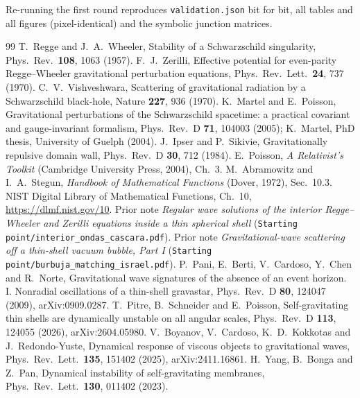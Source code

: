 \documentclass[11pt,a4paper]{article}
\numberwithin{equation}{section}
\begin{document}
\medskip\noindent Re-running the first round reproduces \texttt{validation.json} bit for bit, all tables and all
figures (pixel-identical) and the symbolic junction matrices.

\begin{thebibliography}{99}\small
{} T.~Regge and J.~A.~Wheeler, Stability of a Schwarzschild singularity, Phys.\ Rev.\ \textbf{108}, 1063 (1957).
 F.~J.~Zerilli, Effective potential for even-parity Regge--Wheeler gravitational perturbation equations, Phys.\ Rev.\ Lett.\ \textbf{24}, 737 (1970).
 C.~V.~Vishveshwara, Scattering of gravitational radiation by a Schwarzschild black-hole, Nature \textbf{227}, 936 (1970).
 K.~Martel and E.~Poisson, Gravitational perturbations of the Schwarzschild spacetime: a practical covariant and gauge-invariant formalism, Phys.\ Rev.\ D \textbf{71}, 104003 (2005); K.~Martel, PhD thesis, University of Guelph (2004).
 J.~Ipser and P.~Sikivie, Gravitationally repulsive domain wall, Phys.\ Rev.\ D \textbf{30}, 712 (1984).
 E.~Poisson, \emph{A Relativist's Toolkit} (Cambridge University Press, 2004), Ch.~3.
 M.~Abramowitz and I.~A.~Stegun, \emph{Handbook of Mathematical Functions} (Dover, 1972), Sec.~10.3.
 NIST Digital Library of Mathematical Functions, Ch.~10, \url{https://dlmf.nist.gov/10}.
 Prior note \emph{Regular wave solutions of the interior Regge--Wheeler and Zerilli equations inside a thin spherical shell} (\texttt{Starting point/interior\_ondas\_cascara.pdf}).
 Prior note \emph{Gravitational-wave scattering off a thin-shell vacuum bubble, Part I} (\texttt{Starting point/burbuja\_matching\_israel.pdf}).
 P.~Pani, E.~Berti, V.~Cardoso, Y.~Chen and R.~Norte, Gravitational wave signatures of the absence of an event horizon. I. Nonradial oscillations of a thin-shell gravastar, Phys.\ Rev.\ D \textbf{80}, 124047 (2009), arXiv:0909.0287.
 T.~Pitre, B.~Schneider and E.~Poisson, Self-gravitating thin shells are dynamically unstable on all angular scales, Phys.\ Rev.\ D \textbf{113}, 124055 (2026), arXiv:2604.05980.
 V.~Boyanov, V.~Cardoso, K.~D.~Kokkotas and J.~Redondo-Yuste, Dynamical response of viscous objects to gravitational waves, Phys.\ Rev.\ Lett.\ \textbf{135}, 151402 (2025), arXiv:2411.16861.
 H.~Yang, B.~Bonga and Z.~Pan, Dynamical instability of self-gravitating membranes, Phys.\ Rev.\ Lett.\ \textbf{130}, 011402 (2023).

\end{thebibliography}
\end{document}
